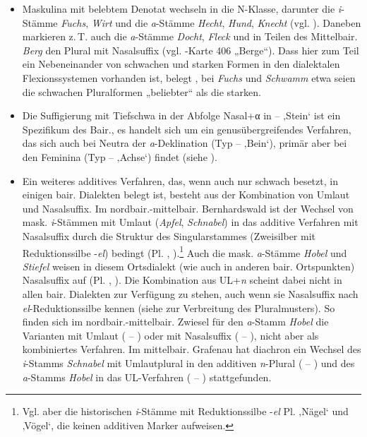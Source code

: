 \begin{itemize}
\item Maskulina mit belebtem Denotat wechseln in die N-Klasse, darunter die \textit{i}{}-Stämme \textit{Fuchs}, \textit{Wirt} und die \textit{a}{}-Stämme \textit{Hecht}, \textit{Hund}, \textit{Knecht} (vgl. ). Daneben markieren z.\,T. auch die \textit{a}{}-Stämme \textit{Docht}, \textit{Fleck} und in Teilen des Mittelbair. \textit{Berg} den Plural mit Nasalsuffix (vgl. \citealt{WA}-Karte 406 „Berge“). Dass hier zum Teil ein Nebeneinander von schwachen und starken Formen in den dialektalen Flexionssystemen vorhanden ist, belegt \citet[65]{Mausser1915}, bei \textit{Fuchs} und \textit{Schwamm} etwa seien die schwachen Pluralformen „beliebter“ als die starken.
\item Die Suffigierung mit Tiefschwa in der Abfolge Nasal+α in  --  ‚Stein‘ ist ein Spezifikum des Bair., es handelt sich um ein genusübergreifendes Verfahren, das sich auch bei Neutra der \textit{a}{}-Deklination (Typ  --  ‚Bein‘), primär aber bei den Feminina (Typ  --  ‚Achse‘) findet (siehe ).
\item Ein weiteres additives Verfahren, das, wenn auch nur schwach besetzt, in einigen bair. Dialekten belegt ist, besteht aus der Kombination von Umlaut und Nasalsuffix. Im nordbair.-mittelbair. Bernhardswald ist der Wechsel von mask. \textit{i}{}-Stämmen mit Umlaut (\textit{Apfel}, \textit{Schnabel}) in das additive Verfahren mit Nasalsuffix durch die Struktur des Singularstammes (Zweisilber mit Reduktionssilbe -\textit{el}) bedingt (Pl. , ).\footnote{Vgl. aber die historischen \textit{i}{}-Stämme mit Reduktionssilbe -\textit{el} Pl.  ‚Nägel‘ und  ‚Vögel‘, die keinen additiven Marker aufweisen.} Auch die mask. \textit{a}{}-Stämme \textit{Hobel} und \textit{Stiefel} weisen in diesem Ortsdialekt (wie auch in anderen bair. Ortspunkten) Nasalsuffix auf (Pl. , ). Die Kombination aus UL+\textit{n} scheint dabei nicht in allen bair. Dialekten zur Verfügung zu stehen, auch wenn sie Nasalsuffix nach \textit{el}{}-Reduktionssilbe kennen (siehe  zur Verbreitung des Pluralmusters). So finden sich im nordbair.-mittelbair. Zwiesel für den \textit{a}{}-Stamm \textit{Hobel} die Varianten mit Umlaut ( -- ) oder mit Nasalsuffix ( -- ), nicht aber als kombiniertes Verfahren. Im mittelbair. Grafenau hat diachron ein Wechsel des \textit{i}{}-Stamms \textit{Schnabel} mit Umlautplural in den additiven \textit{n}{}-Plural (\mbox{} -- ) und des \textit{a}{}-Stamms \textit{Hobel} in das UL-Verfahren ( -- ) stattgefunden.

\end{itemize}
